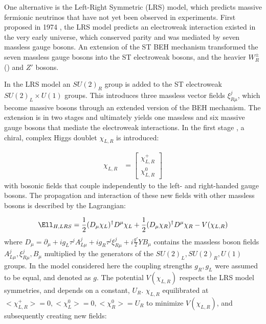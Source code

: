 One alternative is the Left-Right Symmetric (LRS) model, which predicts massive fermionic neutrinos that have not 
yet been observed in experiments.
First proposed in 1974 \cite{earlyLRSModel}, the LRS model predicts an electroweak 
interaction existed in the very early universe, which conserved parity and was mediated by seven massless 
gauge bosons.  An extension of the ST BEH mechanism transformed the seven massless gauge bosons 
into the ST electroweak bosons, and the heavier $W^{\pm}_{R}$ (\WR) and $Z'$ bosons.

In the LRS model an $SU(2)_{R}$ group is added to the ST electroweak $SU(2)_{L} \times U(1)$ groups.
This introduces three massless vector fields $\xi^{j}_{R\mu}$, which become massive 
bosons through an extended version of the BEH mechanism.  The extension is in two stages and 
ultimately yields one massless and six massive gauge bosons that mediate the electroweak interactions.  
In the first stage \cite{lrsHiggsStageOne}, a chiral, complex Higgs doublet $\chi_{L,R}$ is introduced: 

\begin{align}
	\chi_{L,R} &= \begin{bmatrix}
	\chi^{+}_{L,R} \\
	\chi^{0}_{L,R}
	\end{bmatrix}
	\label{eq:stageOneVEV}
\end{align}
with bosonic fields that couple independently to the left- and right-handed gauge bosons.  The propagation and 
interaction of these new fields with other massless bosons is described by the Lagrangian:

\begin{equation}
	\Ell_{H,LRS} = \frac{1}{2}(D_{\mu}\chi_{L})^{\dagger}D^{\mu}\chi_{L} + \frac{1}{2}(D_{\mu}\chi_{R})^{\dagger}D^{\mu}\chi_{R} - V(\chi_{L,R})
	\label{eq:stageOneHiggsLrs}
\end{equation}
where $D_{\mu} = \partial_{\mu} + ig_{L}\tau^{j}A^{j}_{L\mu} + ig_{R}\tau^{j}\xi^{j}_{R\mu} + i\frac{g'}{2}YB_{\mu}$ contains 
the massless boson fields $A^{j}_{L\mu}, \xi^{j}_{R\mu}, B_{\mu}$ multiplied by the generators of the $SU(2)_{L}, SU(2)_{R}, U(1)$ groups.  
In the model considered here the coupling strengths $g_{R}, g_{L}$ were assumed to be equal, and denoted as $g$.  
The potential $V(\chi_{L,R})$ respects the LRS model symmetries, and depends on a constant, $U_{R}$.  $\chi_{L,R}$ 
equilibrated at $<\chi^{+}_{L,R}> = 0, <\chi^{0}_{L}> = 0, <\chi^{0}_{R}> = U_{R}$ to minimize $V(\chi_{L,R})$, 
and subsequently creating new fields:

